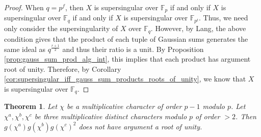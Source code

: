 \documentclass{article}
\newcommand{\F}{\mathbb{F}}
\newtheorem{theorem}{Theorem}[section]
\theoremstyle{definition}
\theoremstyle{definition}
\theoremstyle{remark}
\begin{document}
\begin{proof}
When $q = p^f$, then $X$ is supersingular over $\F_p$ if and only if $X$ is supersingular over $\F_q$ if and only if $X$ is supersingular over $\F_{p^t}$. Thus, we need only consider the supersingularity of $X$ over $\F_q$. However, by Lang, the above condition gives that the product of each tuple of Gaussian sums generates the same ideal as $q^{\frac{r+1}{2}}$ and thus their ratio is a unit. By Proposition \ref{prop:gauss_sum_prod_alg_int}, this implies that each product has argument root of unity. Therefore, by Corollary \ref{cor:supersingular_iff_gauss_sum_products_roots_of_unity}, we know that $X$ is supersingular over $\F_q$.  
\end{proof}


\begin{theorem}
Let $\chi$ be a multiplicative character of order $p-1$ modulo $p$. Let $\chi^a, \chi^b, \chi^c$ be three multiplicative distinct characters modulo $p$ of order $> 2$. Then $g(\chi^a)g(\chi^b)g(\chi^c)^2$ does not have argument a root of unity.
\end{theorem}
\end{document}
